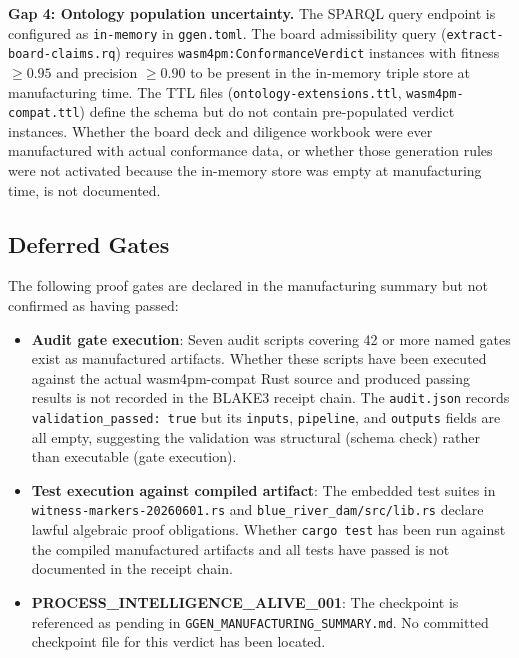 \textbf{Gap 4: Ontology population uncertainty.} The SPARQL query endpoint is configured as
\texttt{in-memory} in \texttt{ggen.toml}. The board admissibility query
(\texttt{extract-board-claims.rq}) requires \texttt{wasm4pm:ConformanceVerdict} instances with
fitness $\geq 0.95$ and precision $\geq 0.90$ to be present in the in-memory triple store at
manufacturing time. The TTL files (\texttt{ontology-extensions.ttl},
\texttt{wasm4pm-compat.ttl}) define the schema but do not contain pre-populated verdict
instances. Whether the board deck and diligence workbook were ever manufactured with actual
conformance data, or whether those generation rules were not activated because the in-memory
store was empty at manufacturing time, is not documented.

\subsection{Deferred Gates}
\label{sec:ggen-open-questions-deferred}

The following proof gates are declared in the manufacturing summary but not confirmed as having
passed:

\begin{itemize}
  \item \textbf{Audit gate execution}: Seven audit scripts covering 42 or more named gates exist
    as manufactured artifacts. Whether these scripts have been executed against the actual
    wasm4pm-compat Rust source and produced passing results is not recorded in the BLAKE3
    receipt chain. The \texttt{audit.json} records \texttt{validation\_passed: true} but its
    \texttt{inputs}, \texttt{pipeline}, and \texttt{outputs} fields are all empty, suggesting
    the validation was structural (schema check) rather than executable (gate execution).
  \item \textbf{Test execution against compiled artifact}: The embedded test suites in
    \texttt{witness-markers-20260601.rs} and \texttt{blue\_river\_dam/src/lib.rs} declare lawful
    algebraic proof obligations. Whether \texttt{cargo test} has been run against the compiled
    manufactured artifacts and all tests have passed is not documented in the receipt chain.
  \item \textbf{PROCESS\_INTELLIGENCE\_ALIVE\_001}: The checkpoint is referenced as pending in
    \texttt{GGEN\_MANUFACTURING\_SUMMARY.md}. No committed checkpoint file for this verdict
    has been located.
\end{itemize}

